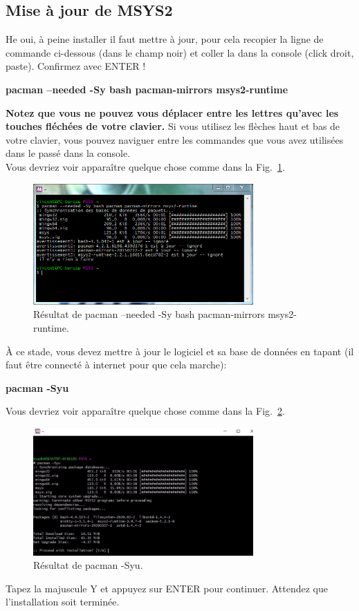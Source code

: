 \documentclass{article}
\newcommand\fig[1]{{Fig.~\ref{#1}}}
\begin{document}
\subsection{Mise à jour de MSYS2}
 He oui, à peine installer il faut mettre à jour, pour cela recopier la ligne de commande ci-dessous (dans le champ noir) et coller la dans la console (click droit, paste). Confirmez avec ENTER !
\begin{tcolorbox}[width=\textwidth,colframe=Purple,colback={black},title={Ceci est la console MSYS2 Shell},outer arc=0mm,colupper=white]    
      \large\textbf{pacman --needed -Sy bash pacman-mirrors msys2-runtime}
\end{tcolorbox}
\textbf{Notez que vous ne pouvez vous déplacer entre les lettres qu'avec les touches fléchées de votre clavier. } Si vous utilisez les flèches haut et bas de votre clavier, vous pouvez naviguer entre les commandes que vous avez utilisées dans le passé dans la console.\\
Vous devriez voir apparaître quelque chose comme dans la \fig{F:firstPaxman}.
\begin{figure}[H]
\center
\includegraphics[width=0.75\textwidth]{Plots/Msys2_7Terminal.png}
\caption{Résultat de pacman --needed -Sy bash pacman-mirrors msys2-runtime.\label{F:firstPaxman}}
\end{figure}
À ce stade, vous devez mettre à jour le logiciel et sa base de données en tapant (il faut être connecté à internet pour que cela marche):
\begin{tcolorbox}[width=\textwidth,colframe=Purple,colback={black},title={Ceci est la console MSYS2 Shell},outer arc=0mm,colupper=white]    
      \large\textbf{pacman -Syu}
\end{tcolorbox}
Vous devriez voir apparaître quelque chose comme dans la \fig{F:2Paxman}.
\begin{figure}[H]
\center
\includegraphics[width=0.75\textwidth]{Plots/Msys2_8Terminal.jpeg}
\caption{Résultat de pacman -Syu.\label{F:2Paxman}}
\end{figure}
Tapez la majuscule Y et appuyez sur ENTER pour continuer. Attendez que l'installation soit terminée. 
\end{document}
